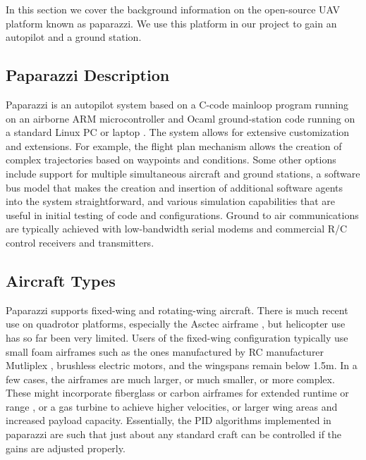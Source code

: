 \documentclass[a4paper,11pt]{report}
\begin{document}
In this section we cover the background information on the open-source UAV platform known as paparazzi. We use this platform in our project to gain an autopilot and a ground station.

\subsection{Paparazzi Description}

Paparazzi is an autopilot system based on a C-code mainloop program running on an airborne ARM microcontroller and Ocaml ground-station code running on a standard Linux PC or laptop \cite{paparazzi}. The system allows for extensive customization and extensions. For example, the flight plan mechanism allows the creation of complex trajectories based on waypoints and conditions. Some other options include support for multiple simultaneous aircraft and ground stations,  a software bus model that makes the creation and insertion of additional software agents into the system straightforward, and various simulation capabilities that are useful in initial testing of code and configurations. Ground to air communications are typically achieved with low-bandwidth serial modems and commercial R/C control receivers and transmitters. 

\subsection{Aircraft Types}

Paparazzi supports fixed-wing and rotating-wing aircraft. There is much recent use on quadrotor platforms, especially the Asctec airframe \cite{asctec}, but helicopter use has so far been very limited. Users of the fixed-wing configuration typically use small foam airframes such as the ones manufactured by RC manufacturer Mutliplex \cite{multiplex}, brushless electric motors, and the wingspans remain below 1.5m. In a few cases, the airframes are much larger, or much smaller, or more complex. These might incorporate fiberglass or carbon airframes for extended runtime \cite{murat} or range \cite{corsica}, or a gas turbine to achieve higher velocities, or larger wing areas and increased payload capacity. Essentially, the PID algorithms implemented in paparazzi are such that just about any standard craft can be controlled if the gains are adjusted properly.
\end{document}
